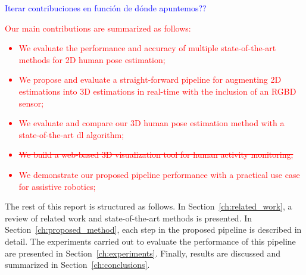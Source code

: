 \textcolor{blue}{Iterar contribuciones en función de dónde apuntemos??}

\textcolor{red}{
Our main contributions are summarized as follows:
\begin{itemize}[leftmargin=*,labelsep=5.8mm]
\item We evaluate the performance and accuracy of multiple state-of-the-art methods for 2D human pose estimation;
\item We propose and evaluate a straight-forward pipeline for augmenting 2D estimations into 3D estimations in real-time with the inclusion of an RGBD sensor;
\item We evaluate and compare our 3D human pose estimation method with a state-of-the-art \gls{dl} algorithm;
\item\sout{We build a web-based 3D visualization tool for human activity monitoring;}
\item We demonstrate our proposed pipeline performance with a practical use case for assistive robotics;
\end{itemize}
}

The rest of this report is structured as follows. In Section~\ref{ch:related_work}, a review of related work and state-of-the-art methods is presented. In Section~\ref{ch:proposed_method}, each step in the proposed pipeline is described in detail. The experiments carried out to evaluate the performance of this pipeline are presented in Section~\ref{ch:experiments}. Finally, results are discussed and summarized in Section~\ref{ch:conclusions}.